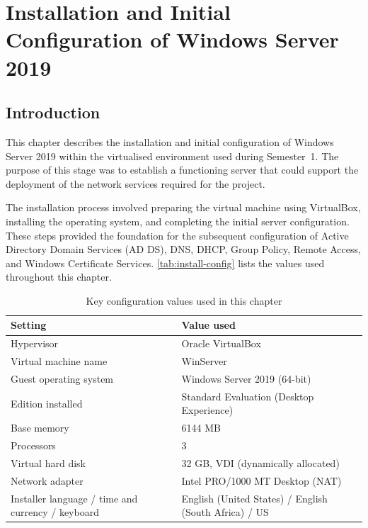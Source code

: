 \chapter{Installation and Initial Configuration of Windows Server 2019}
\label{chap:install}

\section{Introduction}
\label{sec:install-intro}
This chapter describes the installation and initial configuration of Windows Server 2019 within the virtualised environment used during Semester~1. The purpose of this stage was to establish a functioning server that could support the deployment of the network services required for the project.

The installation process involved preparing the virtual machine using VirtualBox, installing the operating system, and completing the initial server configuration. These steps provided the foundation for the subsequent configuration of Active Directory Domain Services (AD DS), DNS, DHCP, Group Policy, Remote Access, and Windows Certificate Services. \autoref{tab:install-config} lists the values used throughout this chapter.

\begin{table}[H]
  \centering
  \small\sffamily
  \renewcommand{\arraystretch}{1.3}
  \begin{tabular}{@{}p{5.6cm}p{8.6cm}@{}}
    \toprule
    \textbf{Setting} & \textbf{Value used} \\
    \midrule
    Hypervisor & Oracle VirtualBox \\
    Virtual machine name & WinServer \\
    Guest operating system & Windows Server 2019 (64-bit) \\
    Edition installed & Standard Evaluation (Desktop Experience) \\
    Base memory & 6144 MB \\
    Processors & 3 \\
    Virtual hard disk & 32 GB, VDI (dynamically allocated) \\
    Network adapter & Intel PRO/1000 MT Desktop (NAT) \\
    Installer language / time and currency / keyboard & English (United States) / English (South Africa) / US \\
    \bottomrule
  \end{tabular}
  \caption{Key configuration values used in this chapter}\label{tab:install-config}
\end{table}

